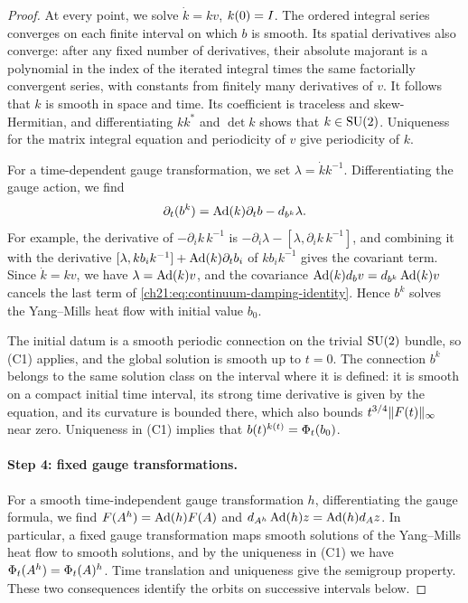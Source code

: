 \begin{proof}
At every point, we solve $\dot k=kv$, $k(0)=I$. The ordered integral series converges on each finite interval on which $b$ is smooth. Its spatial derivatives also converge: after any fixed number of derivatives, their absolute majorant is a polynomial in the index of the iterated integral times the same factorially convergent series, with constants from finitely many derivatives of $v$. It follows that $k$ is smooth in space and time. Its coefficient is traceless and skew-Hermitian, and differentiating $kk^*$ and $\det k$ shows that $k\in\mathrm{SU}(2)$. Uniqueness for the matrix integral equation and periodicity of $v$ give periodicity of $k$.

For a time-dependent gauge transformation, we set $\lambda=\dot kk^{-1}$. Differentiating the gauge action, we find
\begin{equation}\label{ch21:eq:continuum-moving-gauge}
 \partial_t(b^k)=\operatorname{Ad}(k)\partial_tb-d_{b^k}\lambda .
\end{equation}
For example, the derivative of $-\partial_ik\,k^{-1}$ is $-\partial_i\lambda-[\lambda,\partial_ik\,k^{-1}]$, and combining it with the derivative $[\lambda,kb_ik^{-1}]+\operatorname{Ad}(k)\partial_tb_i$ of $kb_ik^{-1}$ gives the covariant term. Since $\dot k=kv$, we have $\lambda=\operatorname{Ad}(k)v$, and the covariance $\operatorname{Ad}(k)d_bv=d_{b^k}\operatorname{Ad}(k)v$ cancels the last term of \eqref{ch21:eq:continuum-damping-identity}. Hence $b^k$ solves the Yang--Mills heat flow with initial value $b_0$.

The initial datum is a smooth periodic connection on the trivial $\mathrm{SU}(2)$ bundle, so (C1) applies, and the global solution is smooth up to $t=0$. The connection $b^k$ belongs to the same solution class on the interval where it is defined: it is smooth on a compact initial time interval, its strong time derivative is given by the equation, and its curvature is bounded there, which also bounds $t^{3/4}\lVert F(t)\rVert_\infty$ near zero. Uniqueness in (C1) implies that $b(t)^{k(t)}=\Phi_t(b_0)$.

\paragraph{Step 4: fixed gauge transformations.}
For a smooth time-independent gauge transformation $h$, differentiating the gauge formula, we find $F(A^h)=\operatorname{Ad}(h)F(A)$ and $d_{A^h}\operatorname{Ad}(h)z=\operatorname{Ad}(h)d_Az$. In particular, a fixed gauge transformation maps smooth solutions of the Yang--Mills heat flow to smooth solutions, and by the uniqueness in (C1) we have $\Phi_t(A^h)=\Phi_t(A)^h$. Time translation and uniqueness give the semigroup property. These two consequences identify the orbits on successive intervals below.


\end{proof}
